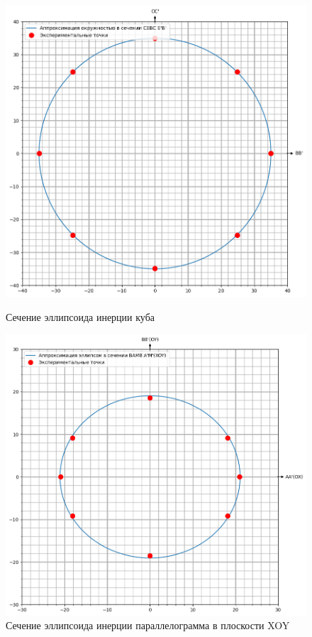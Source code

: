 \documentclass[a4paper,12pt]{article} %
\begin{document}
\begin{itemize}
\begin{figure}[!ht]
    \begin{center}
    \begin{minipage}[h]{0.49\linewidth}
    \includegraphics[width=1\linewidth]{kyb2}
    \caption{Сечение эллипсоида инерции куба} %
    \end{minipage}
    \hfill
    \begin{minipage}[ht]{0.49\linewidth}
    \includegraphics[width=1\linewidth]{XOY}
    \caption{Сечение эллипсоида инерции параллелограмма в плоскости XOY}
    \end{minipage}
    \end{center}
\end{figure}


\end{itemize}
\end{document}

